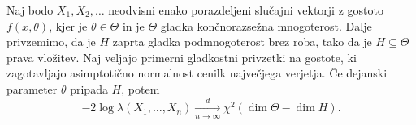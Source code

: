 \begin{izrek}
  Naj bodo $X_1, X_2, \ldots$ neodvisni enako porazdeljeni slučajni vektorji z
  gostoto $f(x, \theta)$, kjer je $\theta \in \Theta$ in je $\Theta$ gladka
  končnorazsežna mnogoterost.
  Dalje privzemimo, da je $H$ zaprta gladka podmnogoterost brez roba, tako da je
  $H \subseteq \Theta$ prava vložitev.
  Naj veljajo primerni gladkostni privzetki na gostote, ki zagotavljajo
  asimptotično normalnost cenilk največjega verjetja.
  Če dejanski parameter $\theta$ pripada $H$, potem
  \[
	-2 \log \lambda(X_1, \ldots, X_n) \xrightarrow[n \to \infty]{d} \chi^2(\dim
	\Theta - \dim H).
  \]
\end{izrek}

